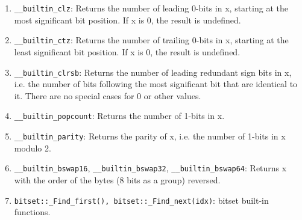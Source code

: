 \begin{enumerate}[noitemsep]
\item \texttt{\_\_builtin\_clz}: Returns the number of leading 0-bits in x, starting at the most significant bit position. If x is 0, the result is undefined.
\item \texttt{\_\_builtin\_ctz}: Returns the number of trailing 0-bits in x, starting at the least significant bit position. If x is 0, the result is undefined.
\item \texttt{\_\_builtin\_clrsb}: Returns the number of leading redundant sign bits in x, i.e. the number of bits following the most significant bit that are identical to it. There are no special cases for 0 or other values.
\item \texttt{\_\_builtin\_popcount}: Returns the number of 1-bits in x.
\item \texttt{\_\_builtin\_parity}: Returns the parity of x, i.e. the number of 1-bits in x modulo 2.
\item \texttt{\_\_builtin\_bswap16}, \texttt{\_\_builtin\_bswap32}, \texttt{\_\_builtin\_bswap64}: Returns x with the order of the bytes (8 bits as a group) reversed.
\item \texttt{bitset::\_Find\_first(), bitset::\_Find\_next(idx)}: bitset built-in functions.
\end{enumerate}

